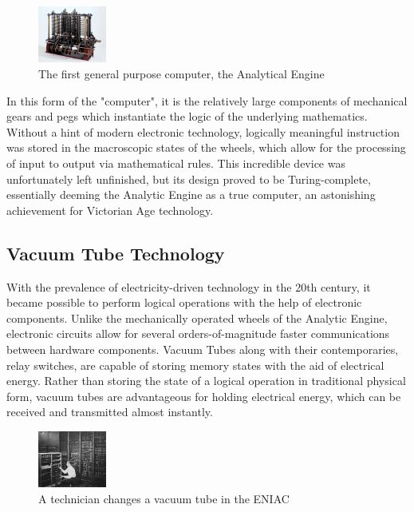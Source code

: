 \documentclass[letterpaper, 10 pt, conference]{IEEEconf}
\begin{document}
\begin{figure}[h!]
\centering
\captionsetup{justification=centering}
\includegraphics[width=0.2\textwidth]{portion-Charles-Babbage-Analytical-Engine-death-mill-1871.jpg}
\caption{The first general purpose computer, the Analytical Engine}
\label{fig:example}
\end{figure} 

In this form of the "computer", it is the relatively large components of mechanical gears and pegs which instantiate the logic of the underlying mathematics. Without a hint of modern electronic technology, logically meaningful instruction was stored in the macroscopic states of the wheels, which allow for the processing of input to output via mathematical rules. This incredible device was unfortunately left unfinished, but its design proved to be Turing-complete, essentially deeming the Analytic Engine as a true computer, an astonishing achievement for Victorian Age technology. 

\subsection{Vacuum Tube Technology}
With the prevalence of electricity-driven technology in the 20th century, it became possible to perform logical operations with the help of electronic components. Unlike the mechanically operated wheels of the Analytic Engine, electronic circuits allow for several orders-of-magnitude faster communications between hardware components. Vacuum Tubes along with their contemporaries, relay switches, are capable of storing memory states with the aid of electrical energy. Rather than storing the state of a logical operation in traditional physical form, vacuum tubes are advantageous for holding electrical energy, which can be received and transmitted almost instantly. 



\begin{figure}[h!]
\centering
\captionsetup{justification=centering}
\includegraphics[width=0.2\textwidth]{ENIAC-changing_a_tube.jpg}
\caption{A technician changes a vacuum tube in the ENIAC}
\label{fig:example}
\end{figure} 
\end{document}
